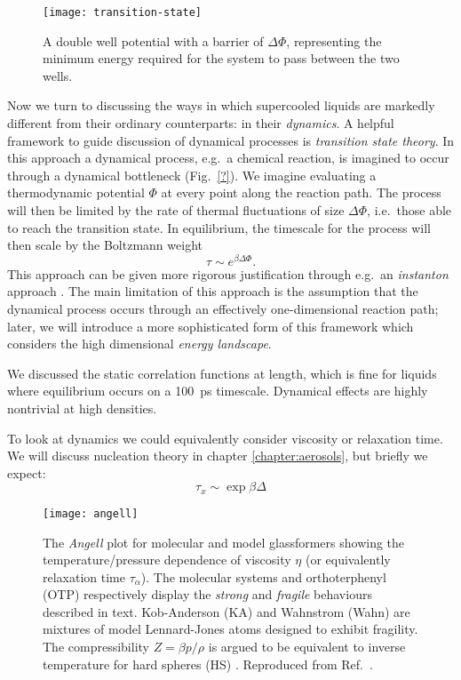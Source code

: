 \begin{SCfigure}
  \texttt{[image: transition-state]}
  \caption[Transition state theory]{
    A double well potential with a barrier of $\Delta\Phi$, representing the minimum energy required for the system to pass between the two wells.
  }
\end{SCfigure}

Now we turn to discussing the ways in which supercooled liquids are markedly different from their ordinary counterparts: in their \emph{dynamics}.
A helpful framework to guide discussion of dynamical processes is \emph{transition state theory}.
In this approach a dynamical process, e.g.\ a chemical reaction, is imagined to occur through a dynamical bottleneck (Fig.\ \ref{?}).
We imagine evaluating a thermodynamic potential%
$\Phi$ at every point along the reaction path.
The process will then be limited by the rate of thermal fluctuations of size $\Delta \Phi$, i.e.\ those able to reach the transition state.
In equilibrium, the timescale for the process will then scale by the Boltzmann weight
\begin{equation}
  \tau \sim e^{\beta \Delta \Phi}.
\end{equation}
This approach can be given more rigorous justification through e.g.\ an \emph{instanton} approach \cite{LangerAP1969}.
The main limitation of this approach is the assumption that the dynamical process occurs through an effectively one-dimensional reaction path; later, we will introduce a more sophisticated form of this framework which considers the high dimensional \emph{energy landscape}.

We discussed the static correlation functions at length, which is fine for liquids where equilibrium occurs on a \SI{100}{\pico\second} timescale.
Dynamical effects are highly nontrivial at high densities.

To look at dynamics we could equivalently consider viscosity or relaxation time.
We will discuss nucleation theory in chapter \ref{chapter:aerosols}, but briefly we expect:
\begin{equation*}
  \tau_x \sim \exp{ \beta \Delta}
\end{equation*}

\begin{SCfigure}
  \texttt{[image: angell]}
  \caption[Angell plot]{
    The \emph{Angell} plot for molecular and model glassformers showing the temperature/pressure dependence of viscosity $\eta$ (or equivalently relaxation time $\tau_\alpha$).
    The molecular systems  and orthoterphenyl (OTP) respectively display the \emph{strong} and \emph{fragile} behaviours described in text.
    Kob-Anderson (KA) and Wahnstrom (Wahn) are mixtures of model Lennard-Jones atoms designed to exhibit fragility.
    The compressibility $Z = \beta p / \rho$ is argued to be equivalent to inverse temperature for hard spheres (HS) \cite{BerthierPRE2009}.
    Reproduced from Ref.\ \cite{RoyallPR2015}.
  }
\end{SCfigure}

